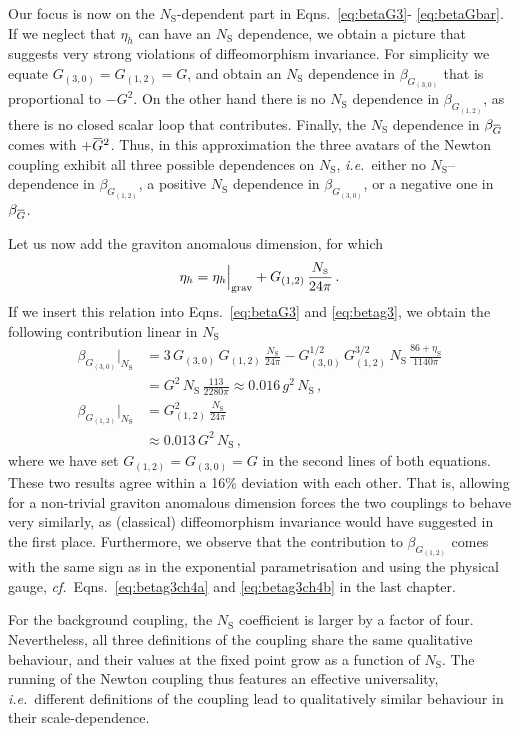 \documentclass[11pt]{book}
\newcommand{\overbar}[1]{\mkern 1.5mu\overline{\mkern-1.5mu#1\mkern-1.5mu}\mkern 1.5mu}
\newcommand\etaS{ \eta_{\scriptscriptstyle{\mathrm{S}}} }
\newcommand\NS{ N_{\scriptscriptstyle{\mathrm{S}}} }
\newcommand\Gback{ \overbar{G} } %
\newcommand\ie{\textit{i.e.}\ }
\newcommand\cf{\textit{cf.}\ }
\numberwithin{equation}{chapter}
\begin{document}
Our focus is now on the $\NS$-dependent part in Eqns.~\eqref{eq:betaG3}- \eqref{eq:betaGbar}.
If we neglect that $\eta_h$ can have an $\NS$ dependence,
we obtain a picture that suggests very strong violations of diffeomorphism invariance.
For simplicity we equate $G_{(3,0)}=G_{(1,2)}=G$,
and obtain an $\NS$ dependence in $\beta_{G_{(3,0)}}$ that is proportional to $-G^2$.
On the other hand there is no $\NS$ dependence in $\beta_{G_{(1,2)}}$,
as there is no closed scalar loop that contributes.
Finally, the $\NS$ dependence in $\beta_{\Gback}$ comes with $+ \Gback^2$.
Thus, in this approximation the three avatars of the Newton coupling exhibit all three
possible dependences on $\NS$, \ie either no $\NS$--dependence in $\beta_{G_{(1,2)}}$,
a positive $\NS$ dependence in $\beta_{G_{(3,0)}}$, or a negative one in $\beta_{\Gback}$.

Let us now add the graviton anomalous dimension, for which
\begin{align}
  \eta_h = \eta_h \Big|_{\rm grav} + G_{(1,2)} \, \frac{\NS}{24 \pi} \,.
\end{align}
If we insert this relation into Eqns.~\eqref{eq:betaG3} and \eqref{eq:betag3},
we obtain the following contribution linear in $\NS$
\begin{align}
  \beta_{G_{(3,0)}}\Big|_{\NS} &= 3 \, G_{(3,0)} \, G_{(1,2)} \, \frac{\NS}{24 \pi}
  - G_{(3,0)}^{1/2} \, G_{(1,2)}^{3/2} \, \NS \, \frac{86+\etaS}{1140 \pi} \nonumber\\[3pt]
                               &= G^2 \, \NS \, \frac{113}{2280 \pi} \approx 0.016 \, g^2 \, \NS \,, \\[5pt]
  \beta_{G_{(1,2)}} \Big|_{\NS}&= G_{(1,2)}^2 \, \frac{\NS}{24 \pi} \nonumber\\[3pt]
                               &\approx 0.013 \, G^2 \, \NS \,,
\end{align}
where we have set $G_{(1,2)} = G_{(3,0)} = G$ in the second lines of both equations.
These two results agree within a 16\% deviation with each other.
That is, allowing for a non-trivial graviton anomalous dimension
forces the two couplings to behave very similarly,
as (classical) diffeomorphism invariance would have suggested in the first place.
Furthermore, we observe that the contribution to $\beta_{G_{(1,2)}}$ comes
with the same sign as in the exponential parametrisation and using the physical gauge,
\cf Eqns.~\eqref{eq:betag3ch4a} and \eqref{eq:betag3ch4b} in the last chapter.

For the background coupling, the $\NS$ coefficient is larger by a factor of four.
Nevertheless, all three definitions of the coupling share the same qualitative behaviour,
and their values at the fixed point grow as a function of $\NS$.
The running of the Newton coupling thus features an effective universality,
\ie different definitions of the coupling lead to qualitatively similar behaviour in
their scale-dependence.
\end{document}
